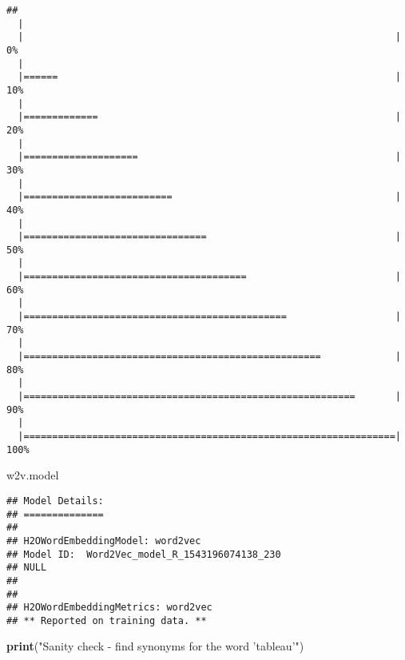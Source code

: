\documentclass[]{article}
\newenvironment{Shaded}{\begin{snugshade}}{\end{snugshade}}
\newcommand{\KeywordTok}[1]{\textcolor[rgb]{0.13,0.29,0.53}{\textbf{{#1}}}}
\newcommand{\StringTok}[1]{\textcolor[rgb]{0.31,0.60,0.02}{{#1}}}
\newcommand{\NormalTok}[1]{{#1}}
\begin{document}
\begin{verbatim}
## 
  |                                                                       
  |                                                                 |   0%
  |                                                                       
  |======                                                           |  10%
  |                                                                       
  |=============                                                    |  20%
  |                                                                       
  |====================                                             |  30%
  |                                                                       
  |==========================                                       |  40%
  |                                                                       
  |================================                                 |  50%
  |                                                                       
  |=======================================                          |  60%
  |                                                                       
  |==============================================                   |  70%
  |                                                                       
  |====================================================             |  80%
  |                                                                       
  |==========================================================       |  90%
  |                                                                       
  |=================================================================| 100%
\end{verbatim}

\begin{Shaded}
\begin{Highlighting}[]
\NormalTok{w2v.model}
\end{Highlighting}
\end{Shaded}

\begin{verbatim}
## Model Details:
## ==============
## 
## H2OWordEmbeddingModel: word2vec
## Model ID:  Word2Vec_model_R_1543196074138_230 
## NULL
## 
## 
## H2OWordEmbeddingMetrics: word2vec
## ** Reported on training data. **
\end{verbatim}

\begin{Shaded}
\begin{Highlighting}[]
\KeywordTok{print}\NormalTok{(}\StringTok{"Sanity check - find synonyms for the word 'tableau'"}\NormalTok{)}
\end{Highlighting}
\end{Shaded}
\end{document}
